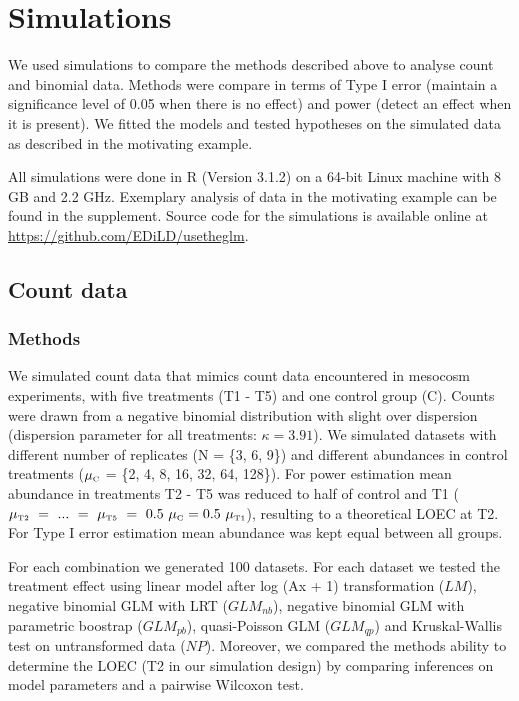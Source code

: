 \documentclass{scrartcl}
\begin{document}



\section{Simulations}
We used simulations to compare the methods described above to analyse count and binomial data.
Methods were compare in terms of Type I error (maintain a significance level of 0.05 when there is no effect) and power (detect an effect when it is present). 
We fitted the models and tested hypotheses on the simulated data as described in the motivating example.

All simulations were done in R (Version 3.1.2) on a 64-bit Linux machine with 8 GB and 2.2 GHz.
Exemplary analysis of data in the motivating example can be found in the supplement.
Source code for the simulations is available online at \url{https://github.com/EDiLD/usetheglm}. 

\subsection{Count data}
\subsubsection{Methods}
We simulated count data that mimics count data encountered in mesocosm experiments, with five treatments (T1 - T5) and one control group (C).
Counts were drawn from a negative binomial distribution with slight over dispersion (dispersion parameter for all treatments: $\kappa = 3.91$).
We simulated datasets with different number of replicates (N = \{3, 6, 9\}) and different abundances in control treatments ($\mu_\text{\tiny C}$ = \{2, 4, 8, 16, 32, 64, 128\}). 
For power estimation mean abundance in treatments T2 - T5 was reduced to half of control and T1 ($\mu_\text{\tiny T2}~=~...~=~\mu_\text{\tiny T5}~=~0.5~\mu_\text{\tiny C} = 0.5~\mu_\text{\tiny T1}$), resulting to a theoretical LOEC at T2.
For Type I error estimation mean abundance was kept equal between all groups.

For each combination we generated 100 datasets. 
For each dataset we tested the treatment effect using linear model after log (Ax + 1) transformation ($LM$), negative binomial GLM with LRT ($GLM_{nb}$), negative binomial GLM with parametric boostrap ($GLM_{pb}$), quasi-Poisson GLM ($GLM_{qp}$) and Kruskal-Wallis test on untransformed data ($NP$).
Moreover, we compared the methods ability to determine the LOEC (T2 in our simulation design) by comparing inferences on model parameters and a pairwise Wilcoxon test.
\end{document}
